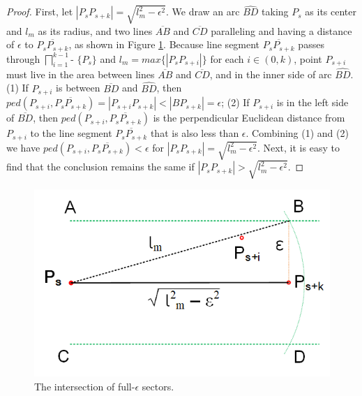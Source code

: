 \begin{proof}
First, let $|P_sP_{s+k}| = \sqrt{l_m^2 - \epsilon^2}$. We draw an arc $\widehat{BD}$ taking $P_s$ as its center and $l_m$ as its radius, and two lines $\overline{AB}$ and $\overline{CD}$ paralleling and having a distance of $\epsilon$ to $\overline{P_sP_{s+k}}$, as shown in Figure \ref{fig:sectorinter}.
Because line segment $\overline{P_sP_{s+k}}$ passes through $\bigsqcap_{i=1}^{k-1}$- $\{P_s\}$ and $l_{m} = max\{|P_sP_{s+i}|\}$ for each $i \in (0, k)$, point $P_{s+i}$ must live in the area between lines $\overline{AB}$ and $\overline{CD}$, and in the inner side of arc $\widehat{BD}$.
(1) If $P_{s+i}$ is between $\overline{BD}$ and $\widehat{BD}$, then $ped(P_{s+i}, \overline{P_sP_{s+k}}) = |{P_{s+i}P_{s+k}}| < |{BP_{s+k}}| = \epsilon$; 
(2) If $P_{s+i}$ is in the left side of $\overline{BD}$, then  $ped(P_{s+i}, \overline{P_sP_{s+k}})$ is the perpendicular Euclidean distance from $P_{s+i}$ to the line segment $\overline{P_sP_{s+k}}$ that is also less than $\epsilon$. Combining (1) and (2) we have $ped(P_{s+i}, \overline{P_sP_{s+k}})< \epsilon$ for $|P_sP_{s+k}| = \sqrt{l_m^2 - \epsilon^2}$.
Next, it is easy to find that the conclusion remains the same if $|P_sP_{s+k}| > \sqrt{l_m^2 - \epsilon^2}$.
\end{proof}

\begin{figure}[tb!]
	\centering
	\includegraphics[scale=1.0]{figures/Fig-SectorInter.png}
	\vspace{-2ex}
	\caption{\small The intersection of full-$\epsilon$ sectors.  }
	\vspace{-1ex}
	\label{fig:sectorinter}
\end{figure}

